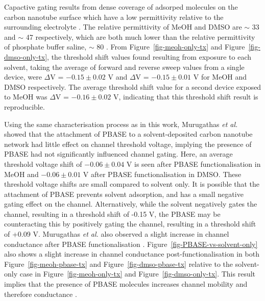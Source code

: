\documentclass[
  a4paper,
]{scrbook}
\begin{document}
Capactive gating results from dense coverage of adsorped molecules on
the carbon nanotube surface which have a low permittivity relative to
the surrounding electrolyte \autocite{Heller2008}. The relative
permittivity of MeOH and DMSO are \(\sim\) 33 \autocite{Mohsen-Nia2010}
and \(\sim\) 47 \autocite{Hunger2010} respectively, which are both much
lower than the relative permittivity of phosphate buffer saline,
\(\sim\) 80 \autocite{Shkodra2021}. From Figure~\ref{fig-meoh-only-tx}
and Figure~\ref{fig-dmso-only-tx}, the threshold shift values found
resulting from exposure to each solvent, taking the average of forward
and reverse sweep values from a single device, were \(\Delta\)V =
\(-0.15 \pm 0.02\) V and \(\Delta\)V = \(-0.15 \pm 0.01\) V for MeOH and
DMSO respectively. The average threshold shift value for a second device
exposed to MeOH was \(\Delta\)V = \(-0.16 \pm 0.02\) V, indicating that
this threshold shift result is reproducible.

Using the same characterisation process as in this work, Murugathas
\emph{et al.} \autocite{Murugathas2019b} showed that the attachment of
PBASE to a solvent-deposited carbon nanotube network had little effect
on channel threshold voltage, implying the presence of PBASE had not
significantly influenced channel gating. Here, an average threshold
voltage shift of \(-0.06\pm0.04\) V is seen after PBASE
functionalisation in MeOH and \(-0.06\pm0.01\) V after PBASE
functionalisation in DMSO. These threshold voltage shifts are small
compared to solvent only. It is possible that the attachment of PBASE
prevents solvent adsorption, and has a small negative gating effect on
the channel. Alternatively, while the solvent negatively gates the
channel, resulting in a threshold shift of -0.15 V, the PBASE may be
counteracting this by positively gating the channel, resulting in a
threshold shift of +0.09 V. Murugathas \emph{et al.} also observed a
slight increase in channel conductance after PBASE functionalisation
\autocite{Murugathas2019b}. Figure~\ref{fig-PBASE-vs-solvent-only} also
shows a slight increase in channel conductance post-functionalisation in
both Figure~\ref{fig-meoh-pbase-tx} and Figure~\ref{fig-dmso-pbase-tx}
relative to the solvent-only case in Figure~\ref{fig-meoh-only-tx} and
Figure~\ref{fig-dmso-only-tx}. This result implies that the presence of
PBASE molecules increases channel mobility and therefore conductance
\autocite{Heller2008}.
\end{document}
